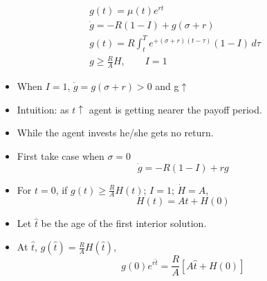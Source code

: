 \documentclass[12pt,compress,handout]{beamer}  %
\begin{document}
\begin{frame}
\begin{gather*}
g(t)=\mu (t)e^{rt} \\
\dot{g}=-R(1-I)+g(\sigma +r) \\
g(t)=R\int_t^T e^{+(\sigma +r)(t-\tau )}(1-I)\,d\tau \\
g\geq \frac{R}{A}H,\qquad I=1
\end{gather*}
\begin{itemize}[<+->]
\item When $I=1$, $\dot{g}=g(\sigma +r)>0$ and g$\uparrow $
\item Intuition: as $t\uparrow $ agent is getting nearer the payoff period.
\item While the agent invests he/she gets no return.
\end{itemize}
\end{frame}


\begin{frame}
\begin{itemize}[<+->]
\item First take case when $\sigma =0$
  \begin{equation*}
    \dot{g}= -R(1-I)+rg
  \end{equation*}

\item For $t=0$, if $g(t)\geq \frac{R}{A}H(t)$; $I=1$; $\dot{H}=A$,
  \begin{equation*}
    H(t)=At+H(0)
  \end{equation*}
\item Let $\hat{t}$ be the age of the first interior solution.
\item At $\hat{t}$, $g(\hat{t})=\frac{R}{A}H(\hat{t})$,
  \begin{equation*}
    g(0)e^{r\hat{t}}=\frac{R}{A}[A\hat{t}+H(0)]
  \end{equation*}
\end{itemize}
\end{frame}
\end{document}
